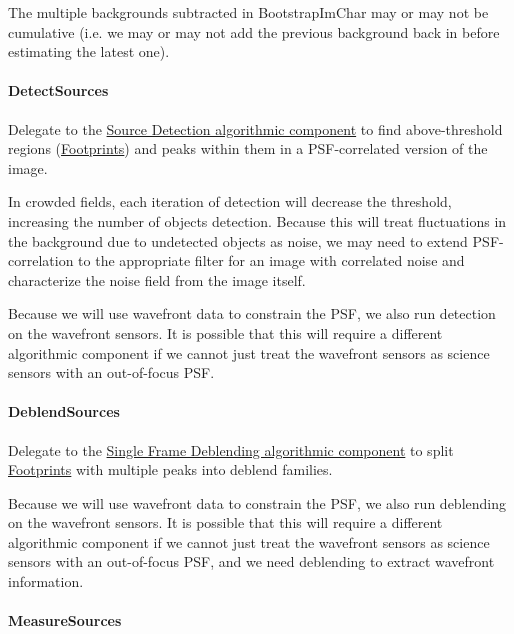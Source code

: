 The multiple backgrounds subtracted in BootstrapImChar may or may not be cumulative (i.e. we may or may not add the previous background back in before estimating the latest one).

\paragraph{DetectSources}
\label{sec:drpBootstrapImChar_DetectSources}

Delegate to the \hyperref[sec:acSourceDetection]{Source Detection algorithmic component} to find above-threshold regions (\hyperref[sec:spFootprints]{Footprints}) and peaks within them in a PSF-correlated version of the image.

In crowded fields, each iteration of detection will decrease the threshold, increasing the number of objects detection.  Because this will treat fluctuations in the background due to undetected objects as noise, we may need to extend PSF-correlation to the appropriate filter for an image with correlated noise and characterize the noise field from the image itself.

Because we will use wavefront data to constrain the PSF, we also run detection on the wavefront sensors.  It is possible that this will require a different algorithmic component if we cannot just treat the wavefront sensors as science sensors with an out-of-focus PSF.

\paragraph{DeblendSources}
\label{sec:drpBootstrapImChar_DeblendSources}

Delegate to the \hyperref[sec:acSingleFrameDeblending]{Single Frame Deblending algorithmic component} to split \hyperref[sec:spFootprints]{Footprints} with multiple peaks into deblend families.

Because we will use wavefront data to constrain the PSF, we also run deblending on the wavefront sensors.  It is possible that this will require a different algorithmic component if we cannot just treat the wavefront sensors as science sensors with an out-of-focus PSF, and we need deblending to extract wavefront information.

\paragraph{MeasureSources}
\label{sec:drpBootstrapImChar_MeasureSources}

